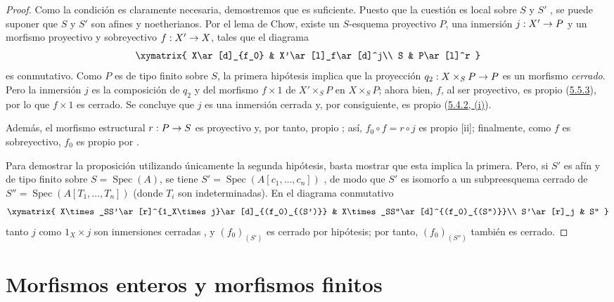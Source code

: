 \documentclass[oneside,10pt]{amsart}
\makeatletter
\newcommand{\ega@arrow}[2]{\mathchoice{#1}{#2}{#2}{#2}}
\renewcommand{\to}{\ega@arrow{\longrightarrow}{\rightarrow}}
\newcommand{\oldpage}[2][]{\marginnote{\normalfont\footnotesize\textbf{#1}~|~#2}\ignorespaces}
\let\EGAOriginalLabel\label
\renewcommand{\label}[1]{\phantomsection\EGAOriginalLabel{#1}}
\makeatother
\begin{document}
\begin{proof}
Como la condición es claramente necesaria, demostremos que es suficiente.
Puesto que la cuestión es local sobre $S$ y $S'$ , se puede suponer que $S$ y $S'$ son afines y noetherianos.
Por el lema de Chow, existe un $S$-esquema proyectivo $P$, una inmersión $j:X'\to P$ y un morfismo proyectivo y sobreyectivo $f:X'\to X$, tales que el diagrama
\[
\xymatrix{
X\ar[d]_{f_0} & X'\ar[l]_f\ar[d]^j\\
S & P\ar[l]^r
}
\]
es conmutativo.
Como $P$ es de tipo finito sobre $S$, la primera hipótesis implica que la proyección $q_2:X\times_SP\to P$ es un morfismo \emph{cerrado}.
Pero la inmersión $j$ es la composición de $q_2$ y del morfismo $f\times1$ de $X'\times_SP$ en $X\times_SP$; ahora bien, $f$, al ser proyectivo, es propio (\hyperref[II.5.5.3-fr]{5.5.3}), por lo que $f\times1$ es cerrado. Se concluye que $j$ es una inmersión cerrada y, por consiguiente, es propio (\hyperref[II.5.4.2-fr]{5.4.2, (i)}).

Además, el morfismo estructural $r:P\to S$ es proyectivo y, por tanto, propio ; así, $f_0\circ f=r\circ j$ es propio [ii];
finalmente, como $f$ es sobreyectivo, $f_0$ es propio por .

Para demostrar la proposición utilizando únicamente la segunda hipótesis, basta mostrar que esta implica la primera.
Pero, si $S'$ es afín y de tipo finito sobre $S=\operatorname{Spec}(A)$,
\oldpage[II]{110}
se tiene $S'=\operatorname{Spec}(A[c_1,\ldots,c_n])$ , de modo que $S'$ es isomorfo a un subpreesquema cerrado de $S''=\operatorname{Spec}(A[T_1,\ldots,T_n])$ (donde $T_i$ son indeterminadas).
En el diagrama conmutativo
\[
\xymatrix{
X\times_SS'\ar[r]^{1_X\times j}\ar[d]_{(f_0)_{(S')}} &
X\times_SS''\ar[d]^{(f_0)_{(S'')}}\\
S'\ar[r]_j & S''
}
\]
tanto $j$ como $1_X\times j$ son inmersiones cerradas , y $(f_0)_{(S')}$ es cerrado por hipótesis; por tanto, $(f_0)_{(S'')}$ también es cerrado.
\end{proof}

\section{Morfismos enteros y morfismos finitos}
\label{section:II.6-fr}
\end{document}
